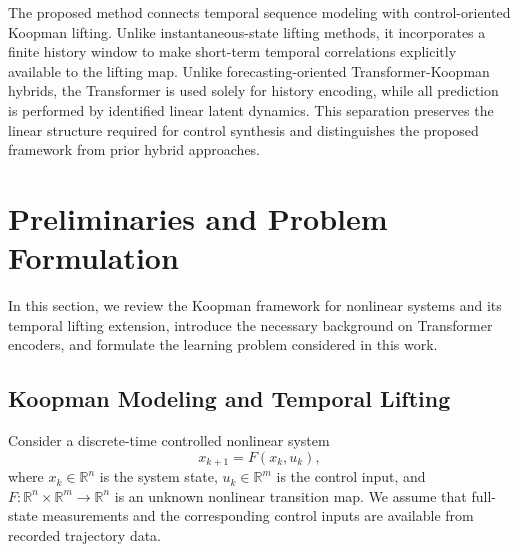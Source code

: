 \documentclass[journal]{IEEEtran}
\begin{document}
The proposed method connects temporal sequence modeling with control-oriented Koopman lifting. Unlike instantaneous-state lifting methods, it incorporates a finite history window to make short-term temporal correlations explicitly available to the lifting map. Unlike forecasting-oriented Transformer-Koopman hybrids, the Transformer is used solely for history encoding, while all prediction is performed by identified linear latent dynamics. This separation preserves the linear structure required for control synthesis and distinguishes the proposed framework from prior hybrid approaches.

\section{Preliminaries and Problem Formulation}
\label{sec:preliminaries_and_problem}

In this section, we review the Koopman framework for nonlinear systems and its temporal lifting extension, introduce the necessary background on Transformer encoders, and formulate the learning problem considered in this work.

\subsection{Koopman Modeling and Temporal Lifting}
\label{sec:preliminary}

Consider a discrete-time controlled nonlinear system
\begin{equation}
    x_{k+1} = F(x_k, u_k),
    \label{eq:nonlinear_system}
\end{equation}
where $x_k \in \mathbb{R}^n$ is the system state, $u_k \in \mathbb{R}^m$ is the control input, and $F:\mathbb{R}^n \times \mathbb{R}^m \to \mathbb{R}^n$ is an unknown nonlinear transition map. We assume that full-state measurements and the corresponding control inputs are available from recorded trajectory data.
\end{document}
